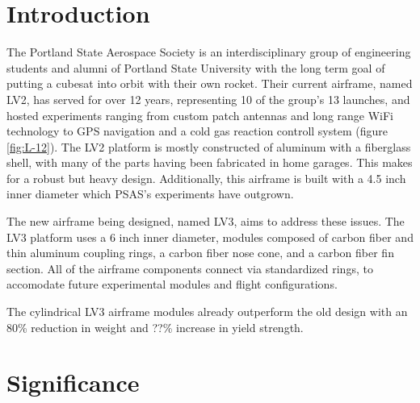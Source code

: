 \documentclass{aiaa-tc}%
\newcommand{\weightReduction}{80\%}
\newcommand{\strengthIncrease}{??\%}
\begin{document}
\section{Introduction}
The Portland State Aerospace Society is an interdisciplinary group of engineering students and alumni of Portland State University with the long term goal of putting a cubesat into orbit with their own rocket. 
Their current airframe, named LV2, has served for over 12 years, representing 10 of the group's 13 launches, and hosted experiments ranging from custom patch antennas and long range WiFi technology to GPS navigation and a cold gas reaction controll system (figure \ref{fig:L-12}). The LV2 platform is mostly constructed of aluminum with a fiberglass shell, with many of the parts having been fabricated in home garages. This makes for a robust but heavy design. Additionally, this airframe is built with a 4.5 inch inner diameter which PSAS's experiments have outgrown. 

The new airframe being designed, named LV3, aims to address these issues. The LV3 platform uses a 6 inch inner diameter, modules composed of carbon fiber and thin aluminum coupling rings, a carbon fiber nose cone, and a carbon fiber fin section. All of the airframe components connect via standardized rings, to accomodate future experimental modules and flight configurations.

The cylindrical LV3 airframe modules already outperform the old design with an \weightReduction{} reduction in weight and \strengthIncrease{} increase in yield strength. 
\section{Significance}
\end{document}
